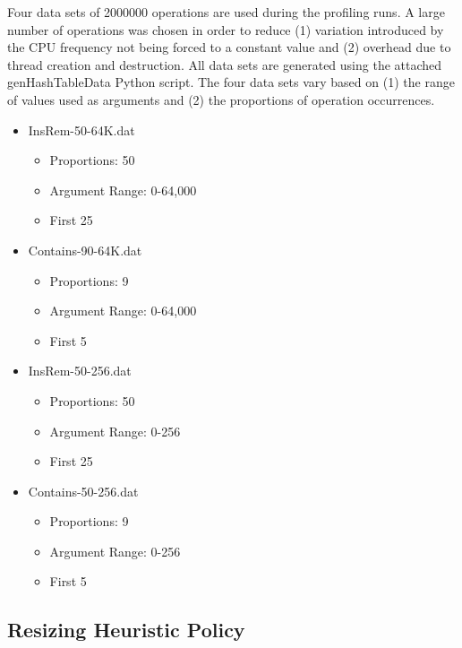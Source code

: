 \documentclass[11pt]{article} %
\begin{document}
Four data sets of 2000000 operations are used during the profiling runs. A large number of operations was chosen in order to reduce (1) variation introduced by the CPU frequency not being forced to a constant value and (2) overhead due to thread creation and destruction. All data sets are generated using the attached genHashTableData Python script. The four data sets vary based on (1) the range of values used as arguments and (2) the proportions of operation occurrences.

\begin{itemize}
	\item InsRem-50-64K.dat
	\begin{itemize}
		\item Proportions: 50%
		\item Argument Range: 0-64,000 
           \item First 25%
	\end{itemize}
	\item Contains-90-64K.dat
	\begin{itemize}
		\item Proportions: 9%
		\item Argument Range: 0-64,000 
           \item First 5%
	\end{itemize}
	\item InsRem-50-256.dat
	\begin{itemize}
		\item Proportions: 50%
		\item Argument Range: 0-256
           \item First 25%
	\end{itemize}
	\item Contains-50-256.dat
	\begin{itemize}
		\item Proportions: 9%
		\item Argument Range: 0-256
           \item First 5%
	\end{itemize}
\end{itemize}


\subsection{Resizing Heuristic Policy}
\end{document}
